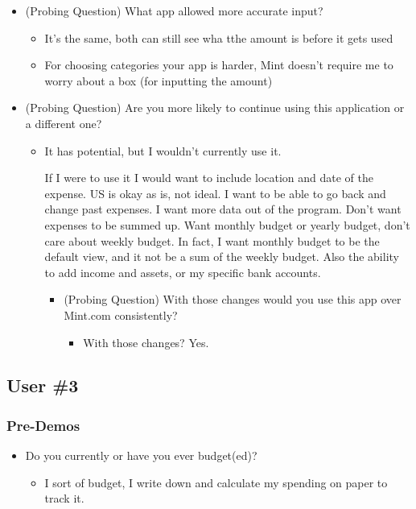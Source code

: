 \documentclass{chi2011}
\begin{document}
\begin{itemize}[noitemsep]
\begin{itemize}[noitemsep]
		\end{itemize}
	\item (Probing Question) What app allowed more accurate input?
		\begin{itemize}[noitemsep]
			\item It's the same,  both can still see wha tthe amount is before it gets used
			\item For choosing categories your app is harder, Mint doesn't require me to worry about a
				  box (for inputting the amount)
		\end{itemize}
	\item (Probing Question) Are you more likely to continue using this application or a different one?
		\begin{itemize}[noitemsep]
			\item It has potential, but I wouldn't currently use it.

				  If I were to use it I would want to include location and date of the expense. US is 
				  okay as is, not ideal. I want to be able to go back and change past expenses. I want
				  more data out of the program. Don't want expenses to be summed up. Want monthly budget
				  or yearly budget, don't care about weekly budget. In fact, I want monthly budget to be 
				  the default view, and it not be a sum of the weekly budget. Also the ability to add 
				  income and assets, or my specific bank accounts. 
			\begin{itemize}[noitemsep]
				\item (Probing Question) With those changes would you use this app over Mint.com 
					  consistently? 
				\begin{itemize}[noitemsep]
					\item With those changes? Yes.
				\end{itemize}
			\end{itemize}
		\end{itemize}
	\end{itemize}
	
	
	\subsection{User \#3}
	\subsubsection{Pre-Demos}
	\begin{itemize}[noitemsep]
		\item Do you currently or have you ever budget(ed)?
		\begin{itemize}[noitemsep]
			\item I sort of budget, I write down and calculate my spending on
				paper to track it. 
		\end{itemize}
	\end{itemize}
	
\end{document}
